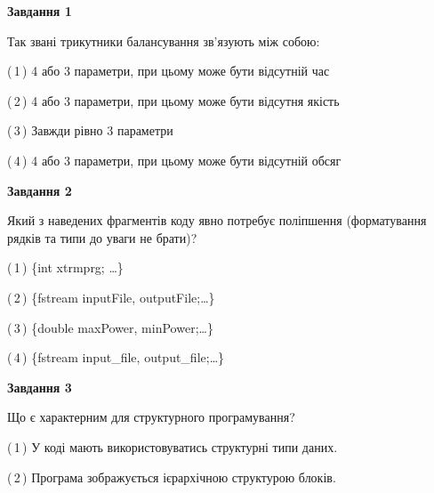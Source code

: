 \documentclass[10pt, ukrainian]{article}
\begin{document}
{
\begin {large}
{\begin {center}\textbf{Завдання 1}\end {center}}\par
Так звані трикутники балансування зв'язують між собою:\par
\vspace{2mm}



(\,1\,) 4 або 3 параметри, при цьому може бути відсутній час%



(\,2\,) 4 або 3 параметри, при цьому може бути відсутня якість%



(\,3\,) Завжди рівно 3 параметри%



(\,4\,) 4 або 3 параметри, при цьому може бути відсутній обсяг %


{\begin {center}\textbf{Завдання 2}\end {center}}\par
Який з наведених фрагментів коду явно потребує поліпшення (форматування рядків та типи до уваги не брати)?\par
\vspace{2mm}



(\,1\,) \{int xtrmprg; …\}%



(\,2\,) \{fstream inputFile, outputFile;…\} %



(\,3\,) \{double maxPower, minPower;…\} %



(\,4\,) \{fstream input\_file, output\_file;…\} %


{\begin {center}\textbf{Завдання 3}\end {center}}\par
Що є характерним для структурного програмування?\par
\vspace{2mm}



(\,1\,) У коді мають використовуватись структурні типи даних. %



(\,2\,) Програма зображується ієрархічною структурою блоків.%




\end{large}}
\end{document}

